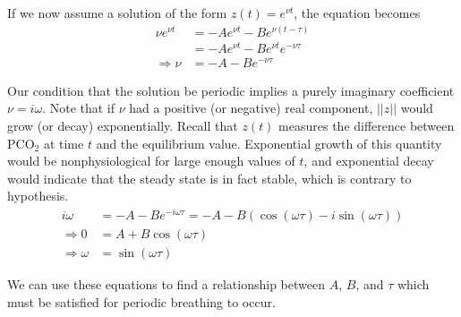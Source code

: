 If we now assume a solution of the form $z(t) = e^{\nu t}$, the equation becomes
\begin{align*}
  \nu e^{\nu t} &= -A e^{\nu t} - B e^{\nu (t-\tau)}\\
  &= -A e^{\nu t} - B e^{\nu t}e^{-\nu \tau}\\
  \Rightarrow \nu &= -A -B e^{-\nu\tau}
\end{align*}

Our condition that the solution be periodic implies a purely imaginary coefficient $\nu = i\omega$. Note that if $\nu$ had a positive (or negative) real component, $||z||$ would grow (or decay) exponentially. Recall that $z(t)$ measures the difference between $\mathrm{PCO}_2$ at time $t$ and the equilibrium value. Exponential growth of this quantity would be nonphysiological for large enough values of $t$, and exponential decay would indicate that the steady state is in fact stable, which is contrary to hypothesis.
\begin{align*}
  i\omega &= -A -B e^{-i\omega \tau} = -A - B \left(\cos(\omega\tau)-i\sin(\omega\tau)\right)\\
  \Rightarrow 0 &= A + B\cos(\omega\tau)\\
  \Rightarrow \omega &= \sin(\omega\tau)
\end{align*}

We can use these equations to find a relationship between $A$, $B$, and $\tau$ which must be satisfied for periodic breathing to occur.
